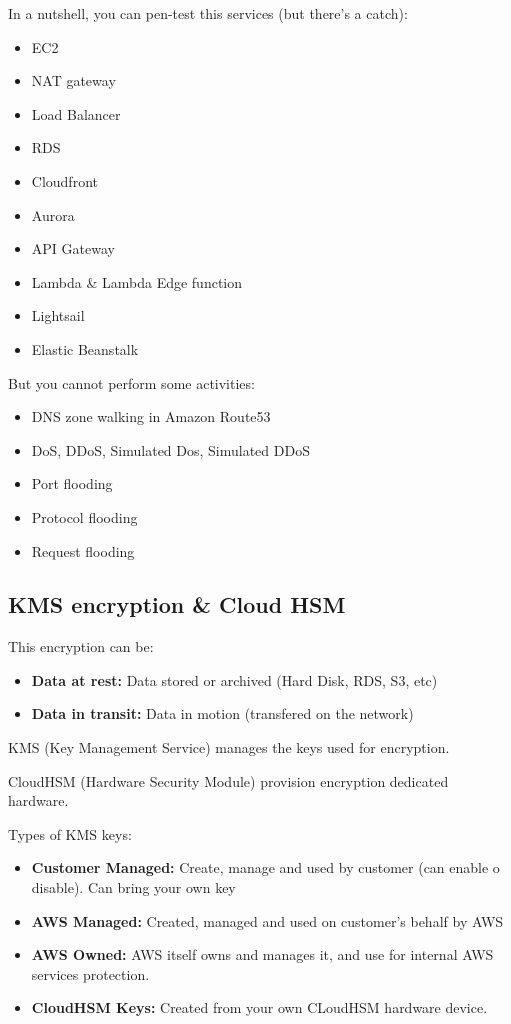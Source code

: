 In a nutshell, you can pen-test this services (but there's a catch):

\begin{itemize}
    \item{EC2}
    \item{NAT gateway}
    \item{Load Balancer}
    \item{RDS}
    \item{Cloudfront}
    \item{Aurora}
    \item{API Gateway}
    \item{Lambda \& Lambda Edge function}
    \item{Lightsail}
    \item{Elastic Beanstalk}
\end{itemize}

But you cannot perform some activities:

\begin{itemize}
    \item{DNS zone walking in Amazon Route53}
    \item{DoS, DDoS, Simulated Dos, Simulated DDoS}
    \item{Port flooding}
    \item{Protocol flooding}
    \item{Request flooding}
\end{itemize}

\subsection{KMS encryption \& Cloud HSM}\label{subsec:kms-encryption-&-cloud-hsm}

This encryption can be:

\begin{itemize}
    \item{\textbf{Data at rest:} Data stored or archived (Hard Disk, RDS, S3, etc)}
    \item{\textbf{Data in transit:} Data in motion (transfered on the network)}
\end{itemize}

KMS (Key Management Service) manages the keys used for encryption.

CloudHSM (Hardware Security Module) provision encryption dedicated hardware.

Types of KMS keys:

\begin{itemize}
    \item{\textbf{Customer Managed:} Create, manage and used by customer (can enable o disable). Can bring your own key}
    \item{\textbf{AWS Managed:} Created, managed and used on customer's behalf by AWS}
    \item{\textbf{AWS Owned:} AWS itself owns and manages it, and use for internal AWS services protection.}
    \item{\textbf{CloudHSM Keys:} Created from your own CLoudHSM hardware device.}
\end{itemize}

